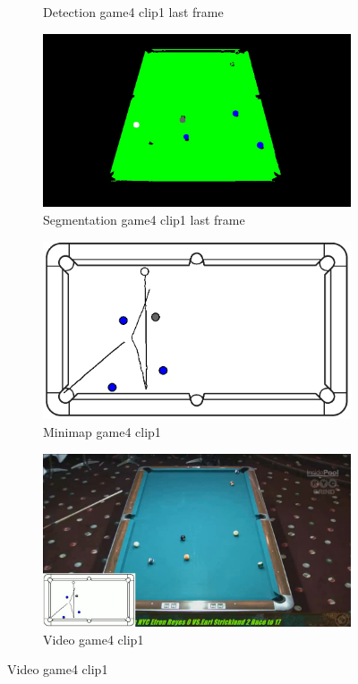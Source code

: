 \begin{figure}[H]
\begin{subfigure}[b]{0.48\textwidth}
		\caption{Detection game4 clip1 last frame}
		\label{fig: game4_clip1_last_frame_detected}
	\end{subfigure}
	\begin{subfigure}[b]{0.48\textwidth}
		\centering
		\includegraphics[width=\textwidth]{images/Segmentation/game4_clip1_segmented_balls_last_frame.jpg}
		\caption{Segmentation game4 clip1 last frame}
		\label{fig: game4_clip1_last_frame_segmented}
	\end{subfigure}
	\begin{subfigure}[b]{0.48\textwidth}
		\centering
		\includegraphics[width=\textwidth]{images/AllMinimap/game4_clip1_minimap.png}
		\caption{Minimap game4 clip1}
		\label{fig: game4_clip1_minimap}
	\end{subfigure}
	\begin{subfigure}[b]{0.48\textwidth}
		\centering
		\includegraphics[width=\textwidth]{images/Video/game4_clip1_video.jpg}
		\caption{Video game4 clip1}
		\label{fig: game4_clip1_video}
	\end{subfigure}


\end{figure}
